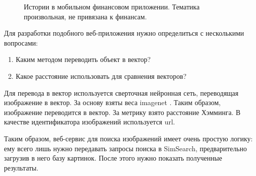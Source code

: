 \documentclass[a4paper,12pt]{extarticle}
\begin{document}
\begin{center}
\begin{figure}[H]
\caption{Истории в мобильном финансовом приложении. Тематика произвольная, не привязана к финансам.}
\label{ris:story_1}
\end{figure}

\end{center}



Для разработки подобного веб-приложения нужно определиться с несколькими вопросами:
\begin{enumerate}
    \item Каким методом переводить объект в вектор?
    \item Какое расстояние использовать для сравнения векторов?
\end{enumerate}

Для перевода в вектор используется сверточная нейронная сеть, переводящая изображение в вектор. За основу взяты веса imagenet \cite{imagenet}. Таким образом, изображение переводится в вектор. За метрику взято расстояние Хэмминга. В качестве идентификатора изображений используется url.

Таким образом, веб-сервис для поиска изображений имеет очень простую логику: ему всего лишь нужно передавать запросы поиска в SimSearch, предварительно загрузив в него базу картинок. После этого нужно показать полученные результаты.
\end{document}
